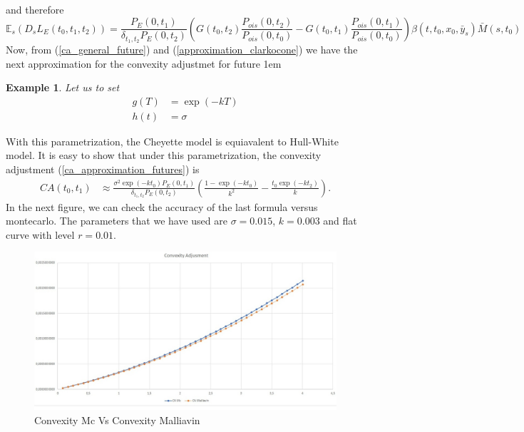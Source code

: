 \documentclass[a4paper,10pt]{article}
\newtheorem{example}[theorem]{Example}
\newcommand{\1}{\mathbf{1}}
\begin{document}
and therefore
\begin{equation}\label{approximation_clarkocone}
\mathbb{E}_s\left( D_s L_{E}(t_0,t_1,t_2) \right) = \frac{P_{E}(0,t_1)}{\delta_{t_1,t_2} P_{E}(0,t_2)} \left(G(t_0,t_2) \frac{P_{ois}(0,t_2)}{P_{ois}(0,t_0)} - G(t_0,t_1) \frac{P_{ois}(0,t_1)}{P_{ois}(0,t_0)}\right)\beta(t,t_0,x_0,\bar{y}_s)\bar{M}(s,t_0)
\end{equation}
Now, from (\ref{ca_general_future}) and (\ref{approximation_clarkocone}) we have the next approximation for the convexity adjustmet for future
\hspace{1cm}
\fboxsep1em

\begin{example}\label{example_ca_future}
Let us to set 
\begin{align*}
g(T) &= \exp(-kT) \\
h(t) &= \sigma
\end{align*}
\end{example}
With this parametrization, the Cheyette model is equiavalent to Hull-White model. It is easy to show that under this parametrization, the convexity adjustment (\ref{ca_approximation_futures}) is
\begin{align*}
CA(t_0,t_1) & \approx \frac{\sigma^{2} \exp(-k t_0)  P_{E}(0,t_1)}{\delta_{t_1,t_2} P_{E}(0,t_2)} \left(\frac{1 - \exp(- k t_0)}{k^{2}} - \frac{t_0 \exp(-k t_2)}{k} \right).   
\end{align*}
In the next figure, we can check the accuracy of the last formula versus montecarlo. The parameters that we have used are $\sigma=0.015$, $k=0.003$ and flat curve with level $r=0.01$.

\begin{figure}[h]
	\begin{center}
		\includegraphics[scale=0.3]{Figures/future_convexity.jpg}
		\caption{Convexity Mc Vs Convexity Malliavin}
	\end{center}
\end{figure} 
\end{document}
